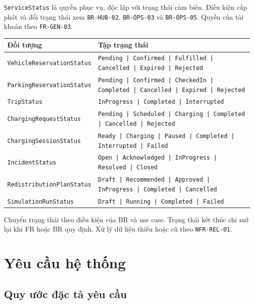 \noindent \texttt{ServiceStatus} là quyền phục vụ, độc lập với trạng thái cảm biến. Điều kiện cấp phát và đổi trạng thái xem \texttt{BR-HUB-02}, \texttt{BR-OPS-03} và \texttt{BR-OPS-05}. Quyền của tài khoản theo \texttt{FR-GEN-03}.

\noindent\begin{minipage}{\linewidth}
  \centering
  \label{tab:workflow-statuses}
  \small
  \begin{tabularx}{\linewidth}{|L{49mm}|Y|}
  \hline
  \centering\arraybackslash\textbf{Đối tượng} & \centering\arraybackslash\textbf{Tập trạng thái}\\
  \hline
  \texttt{VehicleReservationStatus} & \texttt{Pending | Confirmed | Fulfilled | Cancelled | Expired | Rejected}\\
  \hline
  \texttt{ParkingReservationStatus} & \texttt{Pending | Confirmed | CheckedIn | Completed | Cancelled | Expired | Rejected}\\
  \hline
  \texttt{TripStatus} & \texttt{InProgress | Completed | Interrupted}\\
  \hline
  \texttt{ChargingRequestStatus} & \texttt{Pending | Scheduled | Charging | Completed | Cancelled | Rejected}\\
  \hline
  \texttt{ChargingSessionStatus} & \texttt{Ready | Charging | Paused | Completed | Interrupted | Failed}\\
  \hline
  \texttt{IncidentStatus} & \texttt{Open | Acknowledged | InProgress | Resolved | Closed}\\
  \hline
  \texttt{RedistributionPlanStatus} & \texttt{Draft | Recommended | Approved | InProgress | Completed | Cancelled}\\
  \hline
  \texttt{SimulationRunStatus} & \texttt{Draft | Running | Completed | Failed}\\
  \hline
  \end{tabularx}
\end{minipage}\par\medskip

Chuyển trạng thái theo điều kiện của BR và use case. Trạng thái kết thúc chỉ mở lại khi FR hoặc BR quy định. Xử lý dữ liệu thiếu hoặc cũ theo \texttt{NFR-REL-01}.

\clearpage
\section{Yêu cầu hệ thống}

\subsection{Quy ước đặc tả yêu cầu}

